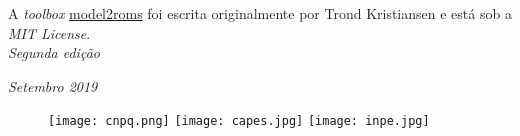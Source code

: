 \noindent A \textit{toolbox} \textcolor{bleu_cite}{\href{https://github.com/trondkr/model2roms}{model2roms}} foi escrita originalmente por 
          Trond Kristiansen e está sob a \textit{MIT License}. \\

\noindent \textit{Segunda edição}  %

\noindent \textit{Setembro 2019} \\ %

\begin{figure}[H]
    \centering
    \vspace*{\fill}
    \texttt{[image: cnpq.png]}
    \hspace{3cm}
    \texttt{[image: capes.jpg]}
    \hspace{3cm}    
    \texttt{[image: inpe.jpg]}
\end{figure}
